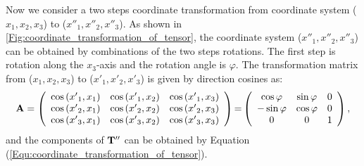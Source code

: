 Now we consider a two steps coordinate transformation from coordinate system ($x_1,x_2,x_3$) to ($x''_1,x''_2,x''_3$). As shown in \ref{Fig:coordinate_transformation_of_tensor}, the coordinate system ($x''_1,x''_2,x''_3$) can be obtained by combinations of the two steps rotations. The first step is rotation along the $x_3$-axis and the rotation angle is $\varphi$. The transformation matrix from ($x_1,x_2,x_3$) to ($x'_1,x'_2,x'_3$) is given by direction cosines as:
\begin{eqnarray}
{\bf{A}} = \left( {\begin{array}{*{20}{c}}
{\cos \left( {{{x'}_1},{x_1}} \right)}&{\cos \left( {{{x'}_1},{x_2}} \right)}&{\cos \left( {{{x'}_1},{x_3}} \right)}\\
{\cos \left( {{{x'}_2},{x_1}} \right)}&{\cos \left( {{{x'}_2},{x_2}} \right)}&{\cos \left( {{{x'}_2},{x_3}} \right)}\\
{\cos \left( {{{x'}_3},{x_1}} \right)}&{\cos \left( {{{x'}_3},{x_2}} \right)}&{\cos \left( {{{x'}_3},{x_3}} \right)}
\end{array}} \right){\rm{ = }}\left( {\begin{array}{*{20}{c}}
{\cos \varphi }&{\sin \varphi }&0\\
{ - \sin \varphi }&{\cos \varphi }&0\\
0&0&1
\end{array}} \right),
\end{eqnarray}
and the components of ${\bf{T''}}$ can be obtained by Equation (\ref{Equ:coordinate_transformation_of_tensor}).

